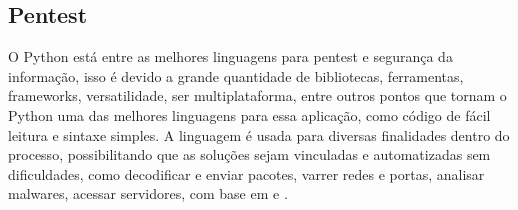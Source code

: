         \subsection{Pentest} 
        O Python está entre as melhores linguagens para pentest e segurança da informação, isso é devido a grande quantidade de bibliotecas, ferramentas, frameworks, versatilidade, ser multiplataforma, entre outros pontos que tornam o Python uma das melhores linguagens para essa aplicação, como código de fácil leitura e sintaxe simples. A linguagem é usada para diversas finalidades dentro do processo, possibilitando que as soluções sejam vinculadas e automatizadas sem dificuldades, como decodificar e enviar pacotes, varrer redes e portas, analisar malwares, acessar servidores, com base em \cite{Moreno2018} e \cite{Seitz2015}.
        
